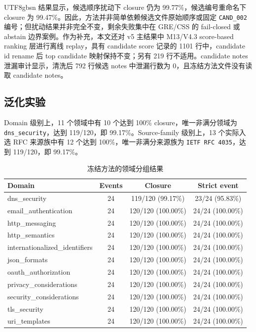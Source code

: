\documentclass[11pt]{article}
\begin{document}
\begin{CJK*}{UTF8}{gbsn}
结果显示，候选顺序扰动下 closure 仍为 99.77\%，候选编号重命名下 closure 为 99.47\%。因此，方法并非简单依赖候选文件原始顺序或固定 \texttt{CAND\_002} 编号；但扰动结果并非完全不变，剩余失败集中在 GRE/CSS 的 fail-closed 或 abstain 边界案例。作为补充，本文还对 v5 主结果中 M13/V4.3 score-based ranking 层进行离线 replay，具有 candidate score 记录的 1101 行中，candidate id rename 后 top candidate 映射保持不变；另有 219 行不适用。candidate notes 泄漏审计显示，清洗后 792 行候选 notes 中泄漏行数为 0，且冻结方法文件没有读取 candidate notes。

\subsection{泛化实验}

Domain 级别上，11 个领域中有 10 个达到 100\% closure，唯一非满分领域为 \texttt{dns\_security}，达到 119/120，即 99.17\%。Source-family 级别上，13 个实际入选 RFC 来源族中有 12 个达到 100\%，唯一非满分来源族为 \texttt{IETF RFC 4035}，达到 119/120，即 99.17\%。

\begin{table}[t]
\centering
\caption{冻结方法的领域分组结果}
\label{tab:domain}
\begin{tabular}{lccc}
\toprule
Domain & Events & Closure & Strict event \\
\midrule
dns\_security & 24 & 119/120 (99.17\%) & 23/24 (95.83\%) \\
email\_authentication & 24 & 120/120 (100.00\%) & 24/24 (100.00\%) \\
http\_messaging & 24 & 120/120 (100.00\%) & 24/24 (100.00\%) \\
http\_semantics & 24 & 120/120 (100.00\%) & 24/24 (100.00\%) \\
internationalized\_identifiers & 24 & 120/120 (100.00\%) & 24/24 (100.00\%) \\
json\_formats & 24 & 120/120 (100.00\%) & 24/24 (100.00\%) \\
oauth\_authorization & 24 & 120/120 (100.00\%) & 24/24 (100.00\%) \\
privacy\_considerations & 24 & 120/120 (100.00\%) & 24/24 (100.00\%) \\
security\_considerations & 24 & 120/120 (100.00\%) & 24/24 (100.00\%) \\
tls\_security & 24 & 120/120 (100.00\%) & 24/24 (100.00\%) \\
uri\_templates & 24 & 120/120 (100.00\%) & 24/24 (100.00\%) \\
\bottomrule
\end{tabular}
\end{table}


\end{CJK*}
\end{document}
